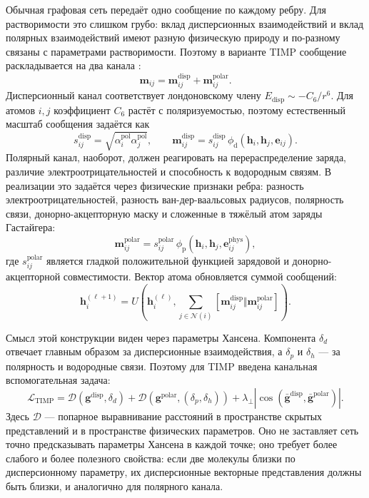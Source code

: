 \documentclass[11pt]{article}
\theoremstyle{definition}
\begin{document}
Обычная графовая сеть передаёт одно сообщение по каждому ребру. Для растворимости это слишком грубо: вклад дисперсионных взаимодействий и вклад полярных взаимодействий имеют разную физическую природу и по-разному связаны с параметрами растворимости. Поэтому в варианте TIMP сообщение раскладывается на два канала \cite{gilmer2017,gasteiger2020,hansen2007}:
\begin{equation*}
    \mathbf m_{ij}
    =
    \mathbf m_{ij}^{\mathrm{disp}}
    +
    \mathbf m_{ij}^{\mathrm{polar}} .
\end{equation*}
Дисперсионный канал соответствует лондоновскому члену $E_{\mathrm{disp}}\sim-C_6/r^6$. Для атомов $i,j$ коэффициент $C_6$ растёт с поляризуемостью, поэтому естественный масштаб сообщения задаётся как
\begin{equation*}
    s_{ij}^{\mathrm{disp}}
    =\sqrt{\alpha_i^{\mathrm{pol}}\alpha_j^{\mathrm{pol}}},
    \qquad
    \mathbf m_{ij}^{\mathrm{disp}}
    =s_{ij}^{\mathrm{disp}}\,\phi_{\mathrm d}
    (\mathbf h_i,\mathbf h_j,\mathbf e_{ij}).
\end{equation*}
Полярный канал, наоборот, должен реагировать на перераспределение заряда, различие электроотрицательностей и способность к водородным связям. В реализации это задаётся через физические признаки ребра: разность электроотрицательностей, разность ван-дер-ваальсовых радиусов, полярность связи, донорно-акцепторную маску и сложенные в тяжёлый атом заряды Гастайгера:
\begin{equation*}
    \mathbf m_{ij}^{\mathrm{polar}}
    =s_{ij}^{\mathrm{polar}}\,\phi_{\mathrm p}
    (\mathbf h_i,\mathbf h_j,\mathbf e_{ij}^{\mathrm{phys}}),
\end{equation*}
где $s_{ij}^{\mathrm{polar}}$ является гладкой положительной функцией зарядовой и донорно-акцепторной совместимости. Вектор атома обновляется суммой сообщений:
\begin{equation*}
    \mathbf h_i^{(\ell+1)}
    =U\!\left(
    \mathbf h_i^{(\ell)},
    \sum_{j\in\mathcal N(i)}
    [\mathbf m_{ij}^{\mathrm{disp}}\Vert \mathbf m_{ij}^{\mathrm{polar}}]
    \right).
\end{equation*}

Смысл этой конструкции виден через параметры Хансена. Компонента $\delta_d$ отвечает главным образом за дисперсионные взаимодействия, а $\delta_p$ и $\delta_h$ --- за полярность и водородные связи. Поэтому для TIMP введена канальная вспомогательная задача:
\begin{equation*}
    \mathcal L_{\mathrm{TIMP}}
    =
    \mathcal D(\mathbf g^{\mathrm{disp}},\delta_d)
    +
    \mathcal D(\mathbf g^{\mathrm{polar}},(\delta_p,\delta_h))
    +
    \lambda_{\perp}
    \left|
    \cos(\bar{\mathbf g}^{\mathrm{disp}},\bar{\mathbf g}^{\mathrm{polar}})
    \right| .
\end{equation*}
Здесь $\mathcal D$ --- попарное выравнивание расстояний в пространстве скрытых представлений и в пространстве физических параметров. Оно не заставляет сеть точно предсказывать параметры Хансена в каждой точке; оно требует более слабого и более полезного свойства: если две молекулы близки по дисперсионному параметру, их дисперсионные векторные представления должны быть близки, и аналогично для полярного канала.
\end{document}
